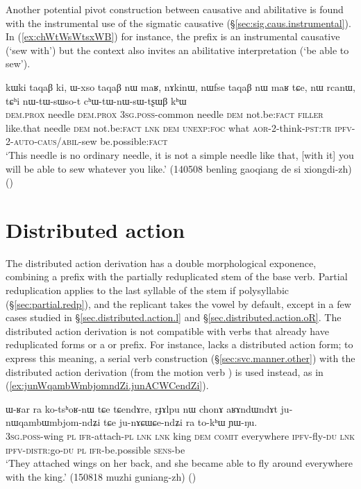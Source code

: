 Another potential pivot construction between causative and abilitative is found with the instrumental use of the sigmatic causative (§\ref{sec:sig.caus.instrumental}). In (\ref{ex:chWtWsWtsxWB}) for instance, the  prefix is an instrumental causative (`sew with') but the context also invites an abilitative interpretation (`be able to sew').

\begin{exe}
\ex \label{ex:chWtWsWtsxWB}
\gll  kɯki taqaβ ki, ɯ-xso taqaβ nɯ maʁ, nɤkinɯ, nɯfse taqaβ nɯ maʁ tɕe, nɯ rcanɯ, tɕʰi nɯ-tɯ-sɯso-t cʰɯ-tɯ-nɯ-sɯ-tʂɯβ kʰɯ  \\
\textsc{dem}.\textsc{prox} needle \textsc{dem}.\textsc{prox} \textsc{3sg}.\textsc{poss}-common needle \textsc{dem} not.be:\textsc{fact} \textsc{filler} like.that needle \textsc{dem} not.be:\textsc{fact} \textsc{lnk} \textsc{dem} \textsc{unexp}:\textsc{foc} what \textsc{aor}-2-think-\textsc{pst}:\textsc{tr} \textsc{ipfv}-2-\textsc{auto}-\textsc{caus/abil}-sew be.possible:\textsc{fact} \\
\glt `This needle is no ordinary needle, it is not a simple needle like that, [with it] you will be able to sew whatever you like.' (140508 benling gaoqiang de si xiongdi-zh)
()
\end{exe}
   
\section{Distributed action} \label{sec:distributed.action} 
The distributed action derivation has a double morphological exponence, combining a prefix  with the partially reduplicated stem of the base verb. Partial reduplication applies to the last syllable of the stem if polysyllabic (§\ref{sec:partial.redp}), and the replicant takes the vowel  by default, except in a few cases studied in §\ref{sec.distributed.action.l} and §\ref{sec.distributed.action.oR}. The distributed action derivation is not compatible with verbs that already have reduplicated forms or a  or  prefix. For instance,  lacks a distributed action form; to express this meaning, a serial verb construction (§\ref{sec:svc.manner.other}) with the distributed action derivation   (from the motion verb ) is used instead, as in (\ref{ex:junWqambWmbjomndZi.junACWCendZi}).

\begin{exe}
\ex \label{ex:junWqambWmbjomndZi.junACWCendZi}
\gll  ɯ-ʁar ra ko-tsʰoʁ-nɯ tɕe tɕendɤre, rɟɤlpu nɯ chonɤ aʁɤndɯndɤt ju-nɯqambɯmbjom-ndʑi tɕe ju-nɤɕɯɕe-ndʑi ra to-kʰɯ ɲɯ-ŋu. \\
\textsc{3sg}.\textsc{poss}-wing \textsc{pl} \textsc{ifr}-attach-\textsc{pl} \textsc{lnk} \textsc{lnk} king \textsc{dem} \textsc{comit} everywhere \textsc{ipfv}-fly-\textsc{du} \textsc{lnk} \textsc{ipfv}-\textsc{distr}:go-\textsc{du} \textsc{pl} \textsc{ifr}-be.possible \textsc{sens}-be \\
\glt `They attached wings on her back, and she became able to fly around everywhere with the king.' (150818 muzhi guniang-zh)
()
\end{exe}

